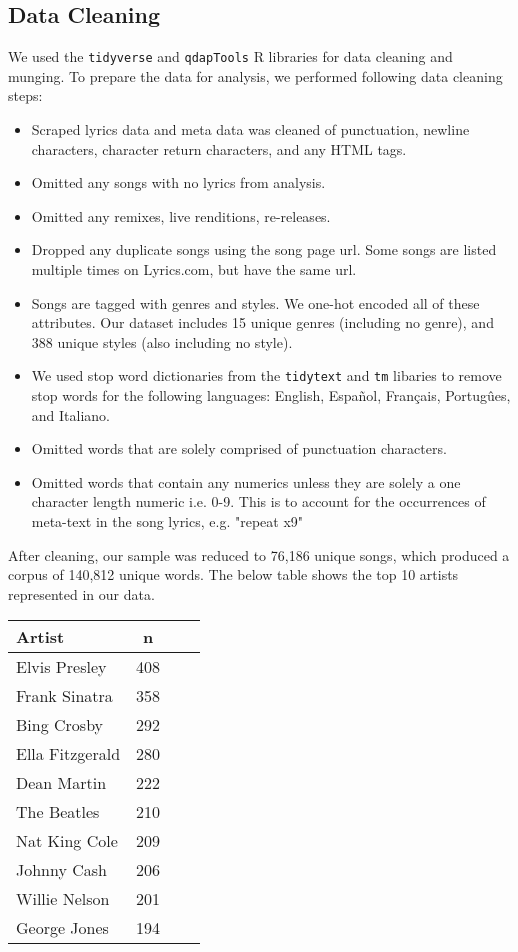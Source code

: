 \documentclass[12pt, titlepage]{article}
\begin{document}
\subsection{Data Cleaning}
We used the \texttt{tidyverse} and \texttt{qdapTools} R libraries for data cleaning and munging. To prepare the data for analysis, we performed following data cleaning steps:  

\begin{itemize}
    \item Scraped lyrics data and meta data was cleaned of punctuation, newline characters, character return characters, and any HTML tags.
    \item Omitted any songs with no lyrics from analysis.
    \item Omitted any remixes, live renditions, re-releases.
    \item Dropped any duplicate songs using the song page url. Some songs are listed multiple times on Lyrics.com, but have the same url.
    \item Songs are tagged with genres and styles. We one-hot encoded all of these attributes. Our dataset includes 15 unique genres (including no genre), and 388 unique styles (also including no style).
    \item We used stop word dictionaries from the \texttt{tidytext} and \texttt{tm} libaries to remove stop words for the following languages: English, Espa\~{n}ol, Fran\c{c}ais, Portug\^{u}es, and Italiano.
    \item Omitted words that are solely comprised of punctuation characters.
    \item Omitted words that contain any numerics unless they are solely a one character length numeric i.e. 0-9. This is to account for the occurrences of meta-text in the song lyrics, e.g. "repeat x9"
\end{itemize}

After cleaning, our sample was reduced to 76,186 unique songs, which produced a corpus of 140,812 unique words. The below table shows the top 10 artists represented in our data.

\begin{center}
\begin{tabular}{|lc|lc|}
\hline
\textbf{Artist} & \textbf{n}\\
\hline
Elvis Presley & 408\\
\hline
Frank Sinatra & 358\\
\hline
Bing Crosby & 292\\
\hline
Ella Fitzgerald & 280\\
\hline
Dean Martin & 222\\
\hline
The Beatles & 210\\
\hline
Nat King Cole & 209\\
\hline
Johnny Cash & 206\\
\hline
Willie Nelson & 201\\
\hline
George Jones & 194\\
\hline
\end{tabular}
\end{center}
\end{document}
